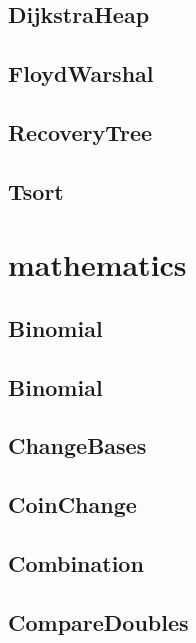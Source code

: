 \subsection{ DijkstraHeap}
\raggedbottom
\hrulefill
\subsection{ FloydWarshal}
\raggedbottom
\hrulefill
\subsection{ RecoveryTree}
\raggedbottom
\hrulefill
\subsection{ Tsort}
\raggedbottom
\hrulefill

\section{mathematics}
\subsection{ Binomial}
\raggedbottom
\hrulefill
\subsection{ Binomial}
\raggedbottom
\hrulefill
\subsection{ ChangeBases}
\raggedbottom
\hrulefill
\subsection{ CoinChange}
\raggedbottom
\hrulefill
\subsection{ Combination}
\raggedbottom
\hrulefill
\subsection{ CompareDoubles}
\raggedbottom
\hrulefill
